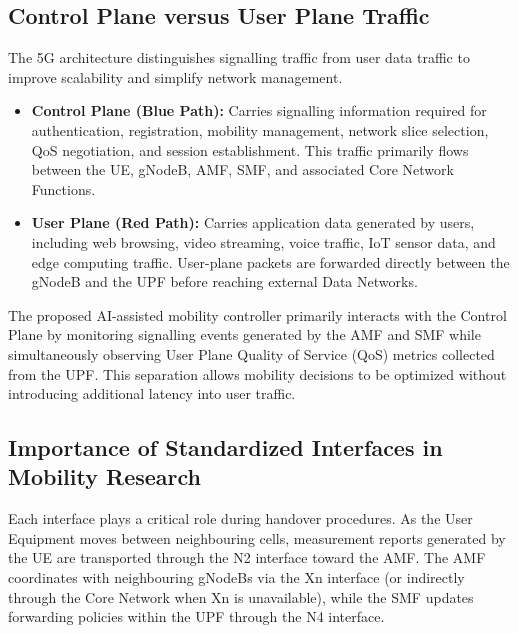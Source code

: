 \documentclass[12pt,a4paper]{article}\usepackage[a4paper,margin=1in]{geometry}\usepackage{graphicx}\usepackage{longtable}\usepackage{booktabs}\usepackage{hyperref}\usepackage{enumitem}\usepackage{amsmath}\usepackage{tikz}\usepackage{pgfgantt}\usepackage{setspace}\setstretch{1.15}\usetikzlibrary{positioning,arrows.meta,shapes.geometric}
\begin{document}
	
	
	\subsection{Control Plane versus User Plane Traffic}
	
	The 5G architecture distinguishes signalling traffic from user data traffic to improve scalability and simplify network management.
	
	\begin{itemize}
		
		\item \textbf{Control Plane (Blue Path):}
		Carries signalling information required for authentication, registration, mobility management, network slice selection, QoS negotiation, and session establishment. This traffic primarily flows between the UE, gNodeB, AMF, SMF, and associated Core Network Functions.
		
		\item \textbf{User Plane (Red Path):}
		Carries application data generated by users, including web browsing, video streaming, voice traffic, IoT sensor data, and edge computing traffic. User-plane packets are forwarded directly between the gNodeB and the UPF before reaching external Data Networks.
		
	\end{itemize}
	
	The proposed AI-assisted mobility controller primarily interacts with the Control Plane by monitoring signalling events generated by the AMF and SMF while simultaneously observing User Plane Quality of Service (QoS) metrics collected from the UPF. This separation allows mobility decisions to be optimized without introducing additional latency into user traffic.
	
	
	\subsection{Importance of Standardized Interfaces in Mobility Research}
	
	Each interface plays a critical role during handover procedures. As the User Equipment moves between neighbouring cells, measurement reports generated by the UE are transported through the N2 interface toward the AMF. The AMF coordinates with neighbouring gNodeBs via the Xn interface (or indirectly through the Core Network when Xn is unavailable), while the SMF updates forwarding policies within the UPF through the N4 interface.
	
\end{document}
